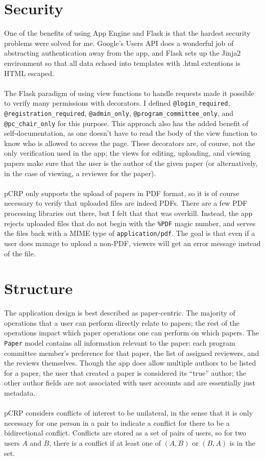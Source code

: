 \documentclass[12pt]{article}
\begin{document}
\section{Security}
	One of the benefits of using App Engine and Flask is that the hardest
	security problems were solved for me. Google's Users API does a
	wonderful job of abstracting authentication away from the app, and
	Flask sets up the Jinja2 environment so that all data echoed into
	templates with .html extentions is HTML escaped.
	\\\\
	The Flask paradigm of using view functions to handle requests made
	it possible to verify many permissions with decorators. I defined
	\texttt{@login\_required}, \texttt{@registration\_required},
	\texttt{@admin\_only}, \texttt{@program\_committee\_only}, and
	\texttt{@pc\_chair\_only} for this purpose. This approach also
	has the added benefit of self-documentation, as one doesn't have
	to read the body of the view function to know who is allowed to
	access the page. These decorators are, of course, not the only
	verification used in the app; the views for editing, uploading, and
	viewing papers make sure that the user is the author of the given paper
	(or alternatively, in the case of viewing, a reviewer for the paper).
	\\\\
	pCRP only supports the upload of papers in PDF format, so it is of
	course necessary to verify that uploaded files are indeed PDFs. There
	are a few PDF processing libraries out there, but I felt that that was
	overkill. Instead, the app rejects uploaded files that do not begin with
	the \texttt{\%PDF} magic number, and serves the files back with a MIME
	type of \texttt{application/pdf}. The goal is that even if a user does
	manage to upload a non-PDF, viewers will get an error message instead of
	the file.

\section{Structure}
	The application design is best described as paper-centric. The majority
	of operations that a user can perform directly relate to papers; the
	rest of the operations impact which paper operations one can perform on
	which papers. The \texttt{Paper} model contains all information relevant
	to the paper: each program committee member's preference for that paper,
	the list of assigned reviewers, and the reviews themselves. Though the
	app does allow multiple authors to be listed for a paper, the user that
	created a paper is considered its ``true'' author; the other author
	fields are not associated with user accounts and are essentially just
	metadata.
	\\\\
	pCRP considers conflicts of interest to be unilateral, in the sense that
	it is only necessary for one person in a pair to indicate a conflict for
	there to be a bidirectional conflict. Conflicts are stored as a set of
	pairs of users, so for two users $A$ and $B$, there is a conflict if
	at least one of $(A,B)$ or $(B,A)$ is in the set.
	


\end{document}
